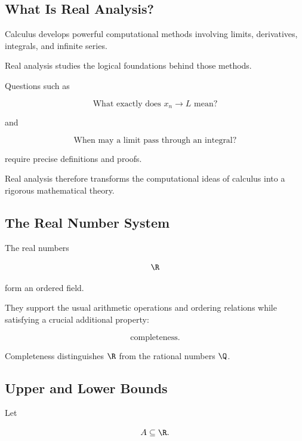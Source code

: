 \subsection{What Is Real Analysis?}
\label{subsec:what-is-real-analysis}

Calculus develops powerful computational methods involving limits,
derivatives, integrals, and infinite series.

Real analysis studies the logical foundations behind those methods.

Questions such as

\[
\boxed{
\text{What exactly does }x_n\to L\text{ mean?}
}
\]

and

\[
\boxed{
\text{When may a limit pass through an integral?}
}
\]

require precise definitions and proofs.

Real analysis therefore transforms the computational ideas of calculus
into a rigorous mathematical theory.

\subsection{The Real Number System}
\label{subsec:real-number-system-analysis}

The real numbers

\[
\R
\]

form an ordered field.

They support the usual arithmetic operations and ordering relations while
satisfying a crucial additional property:

\[
\boxed{
\text{completeness}.
}
\]

Completeness distinguishes \(\R\) from the rational numbers \(\Q\).

\subsection{Upper and Lower Bounds}
\label{subsec:upper-lower-bounds}

Let

\[
A\subseteq\R.
\]

